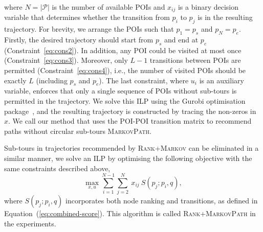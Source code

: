 where $N=|\mathcal{P}|$ is the number of available POIs and $x_{ij}$ is a binary decision variable
that determines whether the transition from $p_i$ to $p_j$ %
is in the resulting trajectory.
For brevity, we arrange the POIs such that $p_1 = p_s$ and $p_N = p_e$.
Firstly, the desired trajectory should start from $p_s$ and end at $p_e$ (Constraint~\ref{eq:cons2}).
In addition, any POI could be visited at most once (Constraint~\ref{eq:cons3}).
Moreover, only $L-1$ transitions between POIs are permitted (Constraint~\ref{eq:cons4}),
i.e., the number of visited POIs should be exactly $L$ (including $p_s$ and $p_e$).
The last constraint, where $u_i$ is an auxiliary variable,
enforces that only a single sequence of POIs without sub-tours is permitted in the trajectory.
We solve this ILP using the Gurobi optimisation package~\cite{gurobi}, 
and the resulting trajectory is constructed by tracing the non-zeros in $x$. 
We call our method that uses the POI-POI transition matrix to recommend paths
without circular sub-tours \textsc{MarkovPath}.


Sub-tours in trajectories recommended by \textsc{Rank+Markov} can be eliminated in a similar manner,
we solve an ILP by optimising the following objective 
with the same constraints described above,
\eqmoveup
\eqmoveup
\eqmoveup
\vspace{-1em}
\begin{equation}
\label{eq:obj2}
\max_{x,u} \sum_{i=1}^{N-1} \sum_{j=2}^N ~x_{ij} ~S(p_j; p_i, q),
\end{equation}
where $S(p_j;p_i,q)$ incorporates both node ranking and transitions, as defined in Equation~(\ref{eq:combined-score}).
This algorithm is called \textsc{Rank+MarkovPath} in the experiments.
